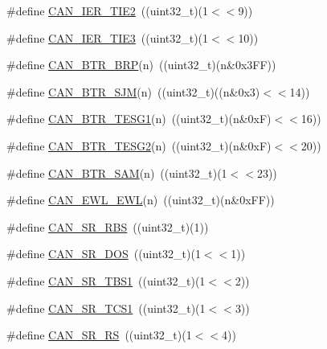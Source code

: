 \begin{DoxyCompactItemize}
\item 
\#define \hyperlink{group___c_a_n___private___macros_ga8168f7849c90eae9dae59835aac5fef8}{\-C\-A\-N\-\_\-\-I\-E\-R\-\_\-\-T\-I\-E2}~((uint32\-\_\-t)(1$<$$<$9))
\item 
\#define \hyperlink{group___c_a_n___private___macros_ga4d555856f1c80fe21c7fbd0858ec2118}{\-C\-A\-N\-\_\-\-I\-E\-R\-\_\-\-T\-I\-E3}~((uint32\-\_\-t)(1$<$$<$10))
\item 
\#define \hyperlink{group___c_a_n___private___macros_ga5155a1064a96ca3936fc54714aa6278d}{\-C\-A\-N\-\_\-\-B\-T\-R\-\_\-\-B\-R\-P}(n)~((uint32\-\_\-t)(n\&0x3\-F\-F))
\item 
\#define \hyperlink{group___c_a_n___private___macros_gab5984b047a79e06602d5472bbd0f5b69}{\-C\-A\-N\-\_\-\-B\-T\-R\-\_\-\-S\-J\-M}(n)~((uint32\-\_\-t)((n\&0x3)$<$$<$14))
\item 
\#define \hyperlink{group___c_a_n___private___macros_gaae8fdfac247c2cf1eb9e37916aa82958}{\-C\-A\-N\-\_\-\-B\-T\-R\-\_\-\-T\-E\-S\-G1}(n)~((uint32\-\_\-t)(n\&0x\-F)$<$$<$16))
\item 
\#define \hyperlink{group___c_a_n___private___macros_ga222446d7f4fb6f0e57ce58c0830033cc}{\-C\-A\-N\-\_\-\-B\-T\-R\-\_\-\-T\-E\-S\-G2}(n)~((uint32\-\_\-t)(n\&0x\-F)$<$$<$20))
\item 
\#define \hyperlink{group___c_a_n___private___macros_ga70ffb2df9cd6fdaa1fc88bf8497dba88}{\-C\-A\-N\-\_\-\-B\-T\-R\-\_\-\-S\-A\-M}(n)~((uint32\-\_\-t)(1$<$$<$23))
\item 
\#define \hyperlink{group___c_a_n___private___macros_ga93ead383104990cad2001c1357033b77}{\-C\-A\-N\-\_\-\-E\-W\-L\-\_\-\-E\-W\-L}(n)~((uint32\-\_\-t)(n\&0x\-F\-F))
\item 
\#define \hyperlink{group___c_a_n___private___macros_ga3f76c8eae3d8555fa55a3c3fa61a58f5}{\-C\-A\-N\-\_\-\-S\-R\-\_\-\-R\-B\-S}~((uint32\-\_\-t)(1))
\item 
\#define \hyperlink{group___c_a_n___private___macros_gadeedd0693b97a06e1693d9298315b639}{\-C\-A\-N\-\_\-\-S\-R\-\_\-\-D\-O\-S}~((uint32\-\_\-t)(1$<$$<$1))
\item 
\#define \hyperlink{group___c_a_n___private___macros_gaa708822ccef44d559b9747b515697e21}{\-C\-A\-N\-\_\-\-S\-R\-\_\-\-T\-B\-S1}~((uint32\-\_\-t)(1$<$$<$2))
\item 
\#define \hyperlink{group___c_a_n___private___macros_gad3fc9e0cf64214f0a97d6edb2deb677c}{\-C\-A\-N\-\_\-\-S\-R\-\_\-\-T\-C\-S1}~((uint32\-\_\-t)(1$<$$<$3))
\item 
\#define \hyperlink{group___c_a_n___private___macros_ga04ff66218ff23feed6e187aabf9491ae}{\-C\-A\-N\-\_\-\-S\-R\-\_\-\-R\-S}~((uint32\-\_\-t)(1$<$$<$4))

\end{DoxyCompactItemize}
